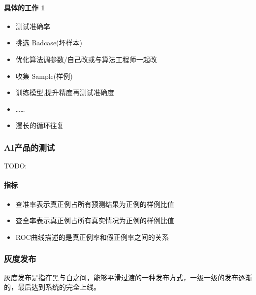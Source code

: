 \documentclass[letterpaper,10pt,english]{sphinxmanual}
\begin{document}
\paragraph{具体的工作 1\sphinxfootnotemark[974]}
\label{\detokenize{chapter_AI_dive/real:id2}}%
\begin{footnotetext}[974]\sphinxAtStartFootnote
{}
%
\end{footnotetext}\ignorespaces \begin{itemize}
\item {} 
测试准确率

\item {} 
挑选 Badcase(坏样本)

\item {} 
优化算法调参数/自己改或与算法工程师一起改

\item {} 
收集 Sample(样例)

\item {} 
训练模型,提升精度再测试准确度

\item {} 
……

\item {} 
漫长的循环往复

\end{itemize}


\subsubsection{AI产品的测试}
\label{\detokenize{chapter_AI_dive/AI_test:ai}}\label{\detokenize{chapter_AI_dive/AI_test::doc}}
TODO: 


\paragraph{指标}
\label{\detokenize{chapter_AI_dive/AI_test:id1}}\begin{itemize}
\item {} 
查准率表示真正例占所有预测结果为正例的样例比值

\item {} 
查全率表示真正例占所有真实情况为正例的样例比值

\item {} 
ROC曲线描述的是真正例率和假正例率之间的关系

\end{itemize}


\subsubsection{灰度发布}
\label{\detokenize{chapter_AI_dive/huidu:id1}}\label{\detokenize{chapter_AI_dive/huidu::doc}}
灰度发布是指在黑与白之间，能够平滑过渡的一种发布方式，一级一级的发布逐渐的，最后达到系统的完全上线。 %
\begin{footnote}[975]\sphinxAtStartFootnote
{}
%
\end{footnote}
\end{document}
